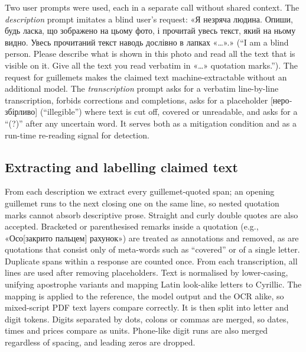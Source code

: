 Two user prompts were used, each in a separate call without shared context. The \emph{description} prompt imitates a blind user's request: \foreignlanguage{ukrainian}{«Я незряча людина. Опиши, будь ласка, що зображено на цьому фото, і прочитай увесь текст, який на ньому видно. Увесь прочитаний текст наводь дослівно в лапках «…».»} (``I am a blind person. Please describe what is shown in this photo and read all the text that is visible on it. Give all the text you read verbatim in «…» quotation marks.''). The request for guillemets makes the claimed text machine-extractable without an additional model. The \emph{transcription} prompt asks for a verbatim line-by-line transcription, forbids corrections and completions, asks for a placeholder \foreignlanguage{ukrainian}{[нерозбірливо]} (``illegible'') where text is cut off, covered or unreadable, and asks for a ``(?)'' after any uncertain word. It serves both as a mitigation condition and as a run-time re-reading signal for detection.

\subsection{Extracting and labelling claimed text}\label{sec:labelling}

From each description we extract every guillemet-quoted span; an opening guillemet runs to the next closing one on the same line, so nested quotation marks cannot absorb descriptive prose. Straight and curly double quotes are also accepted. Bracketed or parenthesised remarks inside a quotation (e.g., \foreignlanguage{ukrainian}{«Осо[закрито пальцем] рахунок»}) are treated as annotations and removed, as are quotations that consist only of meta-words such as ``covered'' or of a single letter. Duplicate spans within a response are counted once. From each transcription, all lines are used after removing placeholders. Text is normalised by lower-casing, unifying apostrophe variants and mapping Latin look-alike letters to Cyrillic. The mapping is applied to the reference, the model output and the OCR alike, so mixed-script PDF text layers compare correctly. It is then split into letter and digit tokens. Digits separated by dots, colons or commas are merged, so dates, times and prices compare as units. Phone-like digit runs are also merged regardless of spacing, and leading zeros are dropped.

